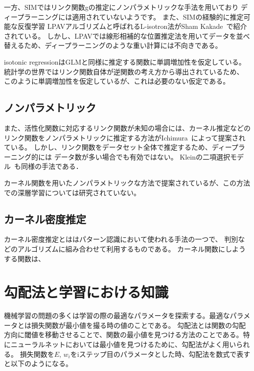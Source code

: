  一方、SIMではリンク関数gの推定にノンパラメトリックな手法を用いており ディープラーニングには適用されていないようです。
 また、SIMの経験的に推定可能な反復学習 LPAVアルゴリズムと呼ばれるL-isotron法がSham Kakade~\cite{efficient_sim}で紹介されている。 
 しかし、LPAVでは線形相補的な位置推定法を用いてデータを並べ替えるため、ディープラーニングのような重い計算には不向きである。 

isotonic regressionはGLMと同様に推定する関数に単調増加性を仮定している。統計学の世界ではリンク関数自体が逆関数の考え方から導出されているため、
このように単調増加性を仮定しているが、これは必要のない仮定である。




\subsection{ノンパラメトリック}



 また、活性化関数に対応するリンク関数が未知の場合には、カーネル推定などのリンク関数をノンパラメトリックに推定する方法がIchimura~\cite{ichimura}によって提案されている。
 しかし、リンク関数をデータセット全体で推定するため、ディープラーニング的には データ数が多い場合でも有効ではない。
 Kleinの二項選択モデル~\cite{klein}も同様の手法である．

 カーネル関数を用いたノンパラメトリックな方法で提案されているが、この方法での深層学習については研究されていない。




\subsection{カーネル密度推定}



カーネル密度推定とははパターン認識において使われる手法の一つで、 判別などのアルゴリズムに組み合わせて利用するものである。
カーネル関数にしようする関数は、











\section{勾配法と学習における知識}
機械学習の問題の多くは学習の際の最適なパラメータを探索する。最適なパラメータとは損失関数が最小値を撮る時の値のことである。
勾配法とは関数の勾配方向に閾値を移動させることで、関数の最小値を見つける方法のことである。特にニューラルネットにおいては最小値を見つけるために、勾配法がよく用いられる。
損失関数を$ E $, $ w_i $をiステップ目のパラメータとした時、勾配法を数式で表すと以下のようになる。

